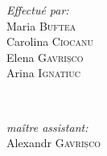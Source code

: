 \begin{titlepage}
\begin{center}
      \begin{minipage}{0.4\textwidth}
      \begin{flushleft} \large
      \emph{Effectué par:}\\
      Maria \textsc{Buftea}\\
      Carolina \textsc{Ciocanu}\\
      Elena \textsc{Gavrișco}\\
      Arina \textsc{Ignatiuc}
      \end{flushleft}
      \end{minipage}
      ~
      \begin{minipage}{0.4\textwidth}
      \begin{flushright} \large
      \emph{maître assistant:} \\
      Alexandr \textsc{Gavrișco} \\ %
      \end{flushright}
      \end{minipage}\\[4cm]

      \vspace{5 mm}






      \vfill %
      \end{center}

\end{titlepage}
